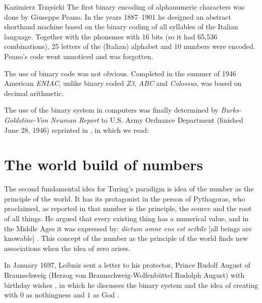 \begin{artengenv}{Kazimierz Trzęsicki}
The first binary encoding of alphanumeric characters was done by Giuseppe Peano. In the years 1887--1901 he designed an abstract shorthand machine based on the binary coding of all syllables of the Italian language. Together with the phonemes with 16 bits (so it had 65,536 combinations), 25 letters of the (Italian) alphabet and 10 numbers were encoded. Peano's code went unnoticed and was forgotten.

The use of binary code was not obvious. Completed in the summer of 1946 American \textit{ENIAC}, unlike binary coded \textit{Z3}, \textit{ABC} and \textit{Colossus}, was based on decimal arithmetic.

The use of the binary system in computers was finally determined by \emph{Burks-Goldstine-Von Neuman Report} to U.S. Army Ordnance Department (finished June 28, 1946) reprinted in \parencite*[p.105]{BurksGoldstineNeumann1947}, in which we read:


\section{The world build of numbers} 
The second fundamental idea for Turing's paradigm is idea of the number as the principle of the world. It has its protagonist in the person of Pythagoras, who proclaimed, as reported in \parencite[p.21]{Guthrie1987} that number is the principle, the source and the root of all things. He argued that every existing thing has a numerical value, and in the Middle Ages it was expressed by: \emph{dictum omne ens est scibile} [all beings are knowable]%
\parencites[pp.135--136]{Cherry2017}[see also][]{heschmeyer_two_2012}.
This concept of the number as the principle of the world finds new associations when the idea of zero arises.

In January 1697, Leibniz sent a letter to his protector, Prince Rudolf August of Braunschweig (Herzog von Braunschweig-Wolfenbüttel Rudolph August) with birthday wishes \parencite{list1697}, in which he discusses the binary system and the idea of creating with $0$ as nothingness and $1$ as God \parencite{Swetz2003}.


\end{artengenv}
